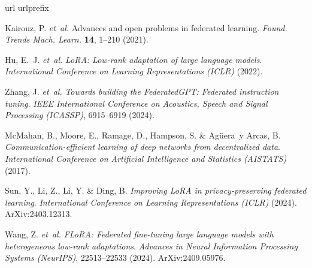 \documentclass[pdflatex,sn-nature,lineno]{sn-jnl}
\begin{document}
\begin{thebibliography}{10}
\expandafter\ifx\csname url\endcsname\relax
  \def\url#1{\burl{#1}}\fi
\expandafter\ifx\csname urlprefix\endcsname\relax\def\urlprefix{URL }\fi
\providecommand{\bibinfo}[2]{#2}
\providecommand{\eprint}[2][]{\url{#2}}
\providecommand{\doi}[1]{\url{https://doi.org/#1}}
\bibcommenthead

\bibinfo{author}{Kairouz, P.} \emph{et~al.}
\newblock \bibinfo{title}{Advances and open problems in federated learning}.
\newblock \emph{\bibinfo{journal}{Found. Trends Mach. Learn.}}
  \textbf{\bibinfo{volume}{14}}, \bibinfo{pages}{1--210}
  (\bibinfo{year}{2021}).

\bibinfo{author}{Hu, E.~J.} \emph{et~al.} \emph{\bibinfo{title}{{LoRA}:
  Low-rank adaptation of large language models}}.
\newblock \emph{\bibinfo{booktitle}{International Conference on Learning
  Representations (ICLR)}} (\bibinfo{year}{2022}).

\bibinfo{author}{Zhang, J.} \emph{et~al.} \emph{\bibinfo{title}{Towards
  building the {FederatedGPT}: Federated instruction tuning}}.
\newblock \emph{\bibinfo{booktitle}{IEEE International Conference on Acoustics,
  Speech and Signal Processing (ICASSP)}}, \bibinfo{pages}{6915--6919}
  (\bibinfo{year}{2024}).

\bibinfo{author}{McMahan, B.}, \bibinfo{author}{Moore, E.},
  \bibinfo{author}{Ramage, D.}, \bibinfo{author}{Hampson, S.} \&
  \bibinfo{author}{Ag{\"{u}}era~y Arcas, B.}
  \emph{\bibinfo{title}{Communication-efficient learning of deep networks from
  decentralized data}}.
\newblock \emph{\bibinfo{booktitle}{International Conference on Artificial
  Intelligence and Statistics (AISTATS)}} (\bibinfo{year}{2017}).

\bibinfo{author}{Sun, Y.}, \bibinfo{author}{Li, Z.}, \bibinfo{author}{Li, Y.}
  \& \bibinfo{author}{Ding, B.} \emph{\bibinfo{title}{Improving {LoRA} in
  privacy-preserving federated learning}}.
\newblock \emph{\bibinfo{booktitle}{International Conference on Learning
  Representations (ICLR)}} (\bibinfo{year}{2024}).
\newblock \bibinfo{note}{ArXiv:2403.12313}.

\bibinfo{author}{Wang, Z.} \emph{et~al.} \emph{\bibinfo{title}{{FLoRA}:
  Federated fine-tuning large language models with heterogeneous low-rank
  adaptations}}.
\newblock \emph{\bibinfo{booktitle}{Advances in Neural Information Processing
  Systems (NeurIPS)}}, \bibinfo{pages}{22513--22533} (\bibinfo{year}{2024}).
\newblock \bibinfo{note}{ArXiv:2409.05976}.


\end{thebibliography}
\end{document}
